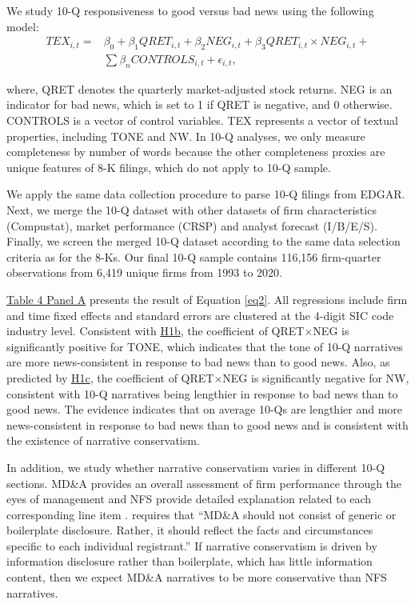 \documentclass[letterpaper,12pt]{article}
\begin{document}
\begin{spacing}{1.5}
We study 10-Q responsiveness to good versus bad news using the following model: 
\begin{equation}
	\begin{aligned} 
		\label{eq2}
		TEX_{i,t}=
		&\beta_0+\beta_1QRET_{i,t}+\beta_2NEG_{i,t}+\beta_3QRET_{i,t}\times NEG_{i,t}+\\
		&\sum\beta_nCONTROLS_{i,t}+\epsilon_{i,t},
	\end{aligned} 
\end{equation}

\noindent where, QRET denotes the quarterly market-adjusted stock returns. NEG is an indicator for bad news, which is set to 1 if QRET is negative, and 0 otherwise. CONTROLS is a vector of control variables. TEX represents a vector of textual properties, including TONE and NW. In 10-Q analyses, we only measure completeness by number of words because the other completeness proxies are unique features of 8-K filings, which do not apply to 10-Q sample.  

We apply the same data collection procedure to parse 10-Q filings from EDGAR. Next, we merge the 10-Q dataset with other datasets of firm characteristics (Compustat), market performance (CRSP) and analyst forecast (I/B/E/S). Finally, we screen the merged 10-Q dataset according to the same data selection criteria as for the 8-Ks. Our final 10-Q sample contains 116,156 firm-quarter observations from 6,419 unique firms from 1993 to 2020.

\hyperref[T4PA]{Table 4 Panel A} presents the result of Equation \eqref{eq2}. All regressions include firm and time fixed effects and standard errors are clustered at the 4-digit SIC code industry level. Consistent with \hyperref[hyp:h1b]{H1b}, the coefficient of QRET$\times$NEG is significantly positive for TONE, which indicates that the tone of 10-Q narratives are more news-consistent in response to bad news than to good news. Also, as predicted by \hyperref[hyp:h1c]{H1c}, the coefficient of QRET$\times$NEG is significantly negative for NW, consistent with 10-Q narratives being lengthier in response to bad news than to good news. The evidence indicates that on average 10-Qs are lengthier and more news-consistent in response to bad news than to good news and is consistent with the existence of narrative conservatism.

In addition, we study whether narrative conservatism varies in different 10-Q sections. MD\&A provides an overall assessment of firm performance through the eyes of management and NFS provide detailed explanation related to each corresponding line item \cite{fasbConceptualFrameworkFinancial2018a, secFinancialReportingManual2019}.  requires that ``MD\&A should not consist of generic or boilerplate disclosure. Rather, it should reflect the facts and circumstances specific to each individual registrant.'' If narrative conservatism is driven by information disclosure rather than boilerplate, which has little information content, then we expect MD\&A narratives to be more conservative than NFS narratives.


\end{spacing}
\end{document}
